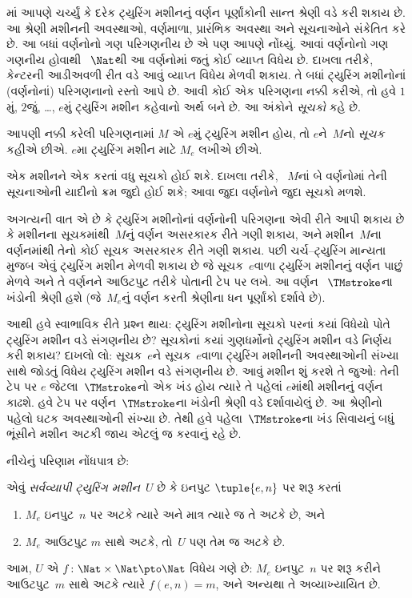 માં આપણે ચર્ચ્યું કે દરેક ટ્યુરિંગ મશીનનું
વર્ણન પૂર્ણાંકોની સાન્ત શ્રેણી વડે કરી શકાય છે. આ શ્રેણી
મશીનની અવસ્થાઓ, વર્ણમાળા, પ્રારંભિક અવસ્થા અને સૂચનાઓને
સંકેતિત કરે છે. આ બધાં વર્ણનોનો ગણ પરિગણનીય છે એ
પણ આપણે નોંધ્યું. આવાં વર્ણનોનો ગણ ગણનીય હોવાથી
~$\Nat$થી આ વર્ણનોમાં જતું કોઈ વ્યાપ્ત વિધેય છે.
દાખલા તરીકે, કેન્ટરની આડીઅવળી રીત વડે આવું
વ્યાપ્ત વિધેય મેળવી શકાય. તે બધાં ટ્યુરિંગ
મશીનોનાં (વર્ણનોનાં) પરિગણનાનો રસ્તો આપે છે. આવી કોઈ
એક પરિગણના નક્કી કરીએ, તો હવે $1$મું, $2$જું, \dots,
$e$મું ટ્યુરિંગ મશીન કહેવાનો અર્થ બને છે. આ અંકોને
\emph{સૂચકો} કહે છે.

\begin{defn}
આપણી નક્કી કરેલી પરિગણનામાં $M$ એ $e$મું ટ્યુરિંગ
મશીન હોય, તો $e$ને~$M$નો \emph{સૂચક} કહીએ છીએ.
$e$મા ટ્યુરિંગ મશીન માટે $M_e$ લખીએ છીએ.
\end{defn}

એક મશીનને એક કરતાં વધુ સૂચકો હોઈ શકે. દાખલા તરીકે,
~$M$નાં બે વર્ણનોમાં તેની સૂચનાઓની યાદીનો ક્રમ જુદો
હોઈ શકે; આવા જુદા વર્ણનોને જુદા સૂચકો મળશે.

અગત્યની વાત એ છે કે ટ્યુરિંગ મશીનોનાં વર્ણનોની પરિગણના
એવી રીતે આપી શકાય છે કે મશીનના સૂચકમાંથી~$M$નું વર્ણન
અસરકારક રીતે ગણી શકાય, અને મશીન~$M$ના વર્ણનમાંથી
તેનો કોઈ સૂચક અસરકારક રીતે ગણી શકાય. પછી ચર્ચ--ટ્યુરિંગ
માન્યતા મુજબ એવું ટ્યુરિંગ મશીન મેળવી શકાય છે જે
સૂચક~$e$વાળા ટ્યુરિંગ મશીનનું વર્ણન પાછું મેળવે અને
તે વર્ણનને આઉટપુટ તરીકે પોતાની ટેપ પર લખે. આ વર્ણન
~$\TMstroke$ના ખંડોની શ્રેણી હશે (જે~$M_e$નું વર્ણન
કરતી શ્રેણીના ધન પૂર્ણાંકો દર્શાવે છે).

આથી હવે સ્વાભાવિક રીતે પ્રશ્ન થાય: ટ્યુરિંગ મશીનોના
સૂચકો પરનાં કયાં વિધેયો પોતે ટ્યુરિંગ મશીન વડે સંગણનીય
છે? સૂચકોનાં કયાં ગુણધર્મોનો ટ્યુરિંગ મશીન વડે નિર્ણય
કરી શકાય? દાખલો લો: સૂચક~$e$ને સૂચક~$e$વાળા ટ્યુરિંગ
મશીનની અવસ્થાઓની સંખ્યા સાથે જોડતું વિધેય ટ્યુરિંગ
મશીન વડે સંગણનીય છે. આવું મશીન શું કરશે તે જુઓ:
તેની ટેપ પર $e$ જેટલા~$\TMstroke$નો એક ખંડ હોય ત્યારે
તે પહેલાં $e$માંથી મશીનનું વર્ણન કાઢશે. હવે ટેપ પર
વર્ણન~$\TMstroke$ના ખંડોની શ્રેણી વડે દર્શાવાયેલું છે.
આ શ્રેણીનો પહેલો ઘટક અવસ્થાઓની સંખ્યા છે.
તેથી હવે પહેલા~$\TMstroke$ના ખંડ સિવાયનું બધું ભૂંસીને
મશીન અટકી જાય એટલું જ કરવાનું રહે છે.

નીચેનું પરિણામ નોંધપાત્ર છે:

\begin{thm} એવું \emph{સર્વવ્યાપી
  ટ્યુરિંગ મશીન}~$U$ છે કે ઇનપુટ $\tuple{e,n}$ પર શરૂ કરતાં
  \begin{enumerate}
    \item $M_e$ ઇનપુટ~$n$ પર અટકે ત્યારે અને માત્ર ત્યારે જ તે અટકે છે, અને
    \item $M_e$ આઉટપુટ $m$ સાથે અટકે, તો~$U$ પણ તેમ જ અટકે છે.
  \end{enumerate}
  આમ, $U$ એ $f\colon \Nat \times \Nat \pto \Nat$ વિધેય
  ગણે છે: $M_e$ ઇનપુટ~$n$ પર શરૂ કરીને આઉટપુટ~$m$
  સાથે અટકે ત્યારે $f(e,n) = m$, અને અન્યથા તે અવ્યાખ્યાયિત છે.
\end{thm}

